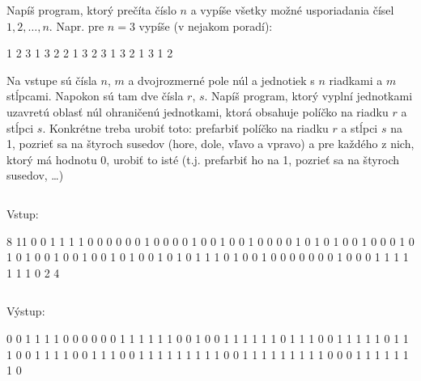 \begin{uloha}
Napíš program, ktorý prečíta číslo $n$ a vypíše všetky možné usporiadania
  čísel $1,2,\ldots,n$. Napr. pre $n=3$ vypíše (v nejakom poradí):

\begin{outputBox}
1 2 3
1 3 2
2 1 3
2 3 1
3 2 1
3 1 2
\end{outputBox}
\end{uloha}


\begin{uloha}
  \label{uloha:fill}
  Na vstupe sú čísla $n$, $m$ a dvojrozmerné pole núl a jednotiek s $n$ riadkami
  a $m$ stĺpcami. Napokon sú tam dve čísla $r$, $s$.
  Napíš program, ktorý vyplní jednotkami uzavretú oblasť núl ohraničenú jednotkami,
  ktorá obsahuje políčko na riadku $r$ a stĺpci $s$.
  Konkrétne treba urobiť toto: prefarbiť políčko na riadku $r$ a stĺpci $s$ na 1,
  pozrieť sa na štyroch susedov (hore, dole, vľavo a vpravo) a pre každého z nich,
  ktorý má hodnotu 0, urobiť to isté (t.j. prefarbiť ho na 1, pozrieť sa na štyroch 
  susedov, \ldots)


  
\begin{column}{0.45}
  Vstup:\\
\begin{outputBox}
8 11
0 0 1 1 1 1 0 0 0 0 0
0 1 0 0 0 0 1 0 0 1 0
0 1 0 0 0 0 1 0 1 0 1
0 0 1 0 0 0 1 0 1 0 1
0 0 1 0 0 1 0 0 1 0 1
0 0 1 0 1 0 1 1 1 0 1 
0 0 1 0 0 0 0 0 0 0 1 
0 0 0 1 1 1 1 1 1 1 0 
2 4
\end{outputBox}
\end{column}
\hfill
\begin{column}{0.45}
Výstup:\\
\begin{outputBox}
0 0 1 1 1 1 0 0 0 0 0
0 1 1 1 1 1 1 0 0 1 0
0 1 1 1 1 1 1 0 1 1 1
0 0 1 1 1 1 1 0 1 1 1
0 0 1 1 1 1 0 0 1 1 1
0 0 1 1 1 1 1 1 1 1 1 
0 0 1 1 1 1 1 1 1 1 1 
0 0 0 1 1 1 1 1 1 1 0 
\end{outputBox}
\end{column}

\end{uloha}

